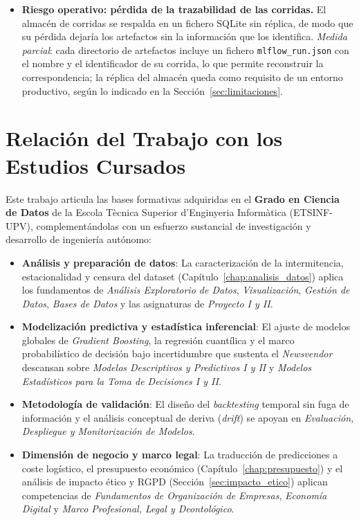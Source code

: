 \begin{itemize}
    \item \textbf{Riesgo operativo: pérdida de la trazabilidad de las corridas.} El almacén de corridas se respalda en un fichero SQLite sin réplica, de modo que su pérdida dejaría los artefactos sin la información que los identifica. \emph{Medida parcial}: cada directorio de artefactos incluye un fichero \texttt{mlflow\_run.json} con el nombre y el identificador de su corrida, lo que permite reconstruir la correspondencia; la réplica del almacén queda como requisito de un entorno productivo, según lo indicado en la Sección~\ref{sec:limitaciones}.
\end{itemize}

\section{Relación del Trabajo con los Estudios Cursados}
\label{sec:relacion_estudios}

Este trabajo articula las bases formativas adquiridas en el \textbf{Grado en Ciencia de Datos} de la Escola Tècnica Superior d'Enginyeria Informàtica (ETSINF-UPV), complementándolas con un esfuerzo sustancial de investigación y desarrollo de ingeniería autónomo:

\begin{itemize}
    \item \textbf{Análisis y preparación de datos}: La caracterización de la intermitencia, estacionalidad y censura del dataset (Capítulo~\ref{chap:analisis_datos}) aplica los fundamentos de \textit{Análisis Exploratorio de Datos}, \textit{Visualización}, \textit{Gestión de Datos}, \textit{Bases de Datos} y las asignaturas de \textit{Proyecto I y II}.

    \item \textbf{Modelización predictiva y estadística inferencial}: El ajuste de modelos globales de \textit{Gradient Boosting}, la regresión cuantílica y el marco probabilístico de decisión bajo incertidumbre que sustenta el \textit{Newsvendor} descansan sobre \textit{Modelos Descriptivos y Predictivos I y II} y \textit{Modelos Estadísticos para la Toma de Decisiones I y II}.

    \item \textbf{Metodología de validación}: El diseño del \textit{backtesting} temporal sin fuga de información y el análisis conceptual de deriva (\textit{drift}) se apoyan en \textit{Evaluación, Despliegue y Monitorización de Modelos}.

    \item \textbf{Dimensión de negocio y marco legal}: La traducción de predicciones a coste logístico, el presupuesto económico (Capítulo~\ref{chap:presupuesto}) y el análisis de impacto ético y RGPD (Sección~\ref{sec:impacto_etico}) aplican competencias de \textit{Fundamentos de Organización de Empresas}, \textit{Economía Digital} y \textit{Marco Profesional, Legal y Deontológico}.
\end{itemize}

